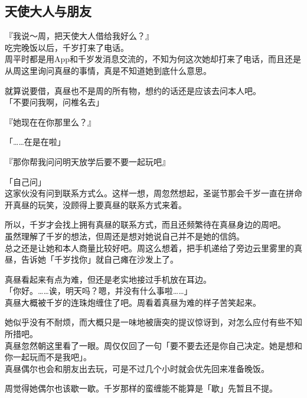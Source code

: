 \subsection{天使大人与朋友}

『我说～周，把天使大人借给我好么？』\\

吃完晚饭以后，千岁打来了电话。\\

周平时都是用App和千岁发消息交流的，不知为何这次她却打来了电话，而且还是从周这里询问真昼的事情，真是不知道她到底什么意思。

就算说要借，真昼也不是周的所有物，想约的话还是应该去问本人吧。\\

「不要问我啊，问椎名去」

『她现在在你那里么？』

「……在是在啦」

『那你帮我问问明天放学后要不要一起玩吧』

「自己问」\\

这家伙没有问到联系方式么。这样一想，周忽然想起，圣诞节那会千岁一直在拼命开真昼的玩笑，没顾得上要真昼的联系方式来着。

所以，千岁才会找上拥有真昼的联系方式，而且还频繁待在真昼身边的周吧。\\

虽然理解了千岁的想法，但周还是想对她说自己并不是她的信鸽。\\

总之还是让她和本人商量比较好吧。周这么想着，把手机递给了旁边云里雾里的真昼，告诉她「千岁找你」就自己瘫在沙发上了。

真昼看起来有点为难，但还是老实地接过手机放在耳边。\\

「你好。……诶，明天吗？嗯，并没有什么事啦……」\\

真昼大概被千岁的连珠炮缠住了吧。周看着真昼为难的样子苦笑起来。

她似乎没有不耐烦，而大概只是一味地被唐突的提议惊讶到，对怎么应付有些不知所措吧。\\

真昼忽然朝这里看了一眼。周仅仅回了一句「要不要去还是你自己决定。她是想和你一起玩而不是我吧」。\\

真昼偶尔也会和朋友出去玩，可是不过几个小时就会优先回来准备晚饭。

周觉得她偶尔也该歇一歇。千岁那样的蛮缠能不能算是「歇」先暂且不提。\\

